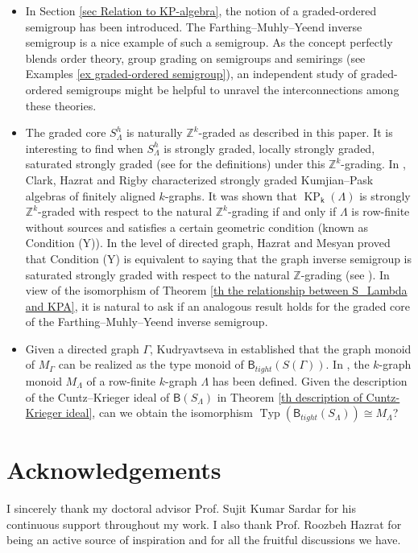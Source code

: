 \documentclass[a4paper,reqno,11pt]{amsart}
\numberwithin{equation}{section}
\theoremstyle{definition}
\theoremstyle{remark}
\newcommand{\Typ}{\operatorname{Typ}}
\newcommand{\KP}{\operatorname{KP}}
\begin{document}
\begin{itemize}
\item[$\bullet$] In Section \ref{sec Relation to KP-algebra}, the notion of a graded-ordered semigroup has been introduced. The Farthing--Muhly--Yeend inverse semigroup is a nice example of such a semigroup. As the concept perfectly blends order theory, group grading on semigroups and semirings (see Examples \ref{ex graded-ordered semigroup}), an independent study of graded-ordered semigroups might be helpful to unravel the interconnections among these theories.

\item[$\bullet$] The graded core $S_\Lambda^h$ is naturally $\mathbb{Z}^k$-graded as described in this paper. It is interesting to find when $S_\Lambda^h$ is strongly graded, locally strongly graded, saturated strongly graded (see \cite{HazMes} for the definitions) under this $\mathbb{Z}^k$-grading. In \cite{CHR}, Clark, Hazrat and Rigby characterized strongly graded Kumjian--Pask algebras of finitely aligned $k$-graphs. It was shown that $\KP_\mathsf{k}(\Lambda)$ is strongly $\mathbb{Z}^k$-graded with respect to the natural $\mathbb{Z}^k$-grading if and only if $\Lambda$ is row-finite without sources and satisfies a certain geometric condition (known as Condition (Y)). In the level of directed graph, Hazrat and Mesyan proved that Condition (Y) is equivalent to saying that the graph inverse semigroup is saturated strongly graded with respect to the natural $\mathbb{Z}$-grading (see \cite[Lemma 8.11]{HazMes}). In view of the isomorphism of Theorem \ref{th the relationship between S_Lambda and KPA}, it is natural to ask if an analogous result holds for the graded core of the Farthing--Muhly--Yeend inverse semigroup.

\item[$\bullet$] Given a directed graph $\Gamma$, Kudryavtseva in \cite{Ganna} established that the graph monoid of $M_\Gamma$ can be realized as the type monoid of $\mathsf{B}_{tight}(S(\Gamma))$. In \cite{HMPS}, the $k$-graph monoid $M_\Lambda$ of a row-finite $k$-graph $\Lambda$ has been defined. Given the description of the Cuntz--Krieger ideal of $\mathsf{B}(S_\Lambda)$ in Theorem \ref{th description of Cuntz-Krieger ideal}, can we obtain the isomorphism $\Typ(\mathsf{B}_{tight}(S_\Lambda))\cong M_\Lambda$? 
\end{itemize}

\section*{Acknowledgements} I sincerely thank my doctoral advisor Prof. Sujit Kumar Sardar for his continuous support throughout my work. I also thank Prof. Roozbeh Hazrat for being an active source of inspiration and for all the fruitful discussions we have.   
\end{document}
